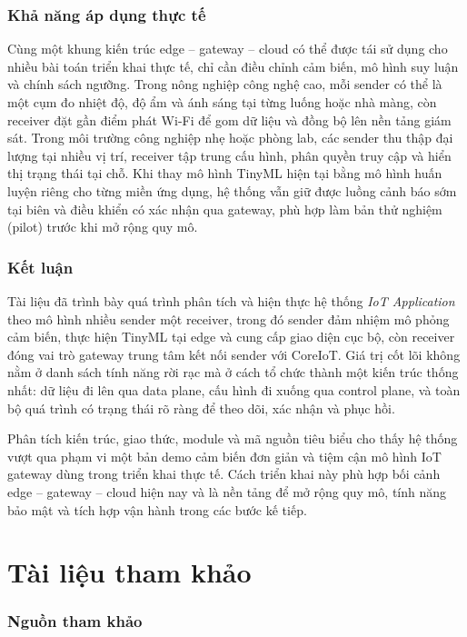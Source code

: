 \documentclass[12pt,a4paper]{report}
\begin{document}
\section{Khả năng áp dụng thực tế}
Cùng một khung kiến trúc edge -- gateway -- cloud có thể được tái sử dụng cho nhiều bài toán triển khai thực tế, chỉ cần điều chỉnh cảm biến, mô hình suy luận và chính sách ngưỡng. Trong nông nghiệp công nghệ cao, mỗi sender có thể là một cụm đo nhiệt độ, độ ẩm và ánh sáng tại từng luống hoặc nhà màng, còn receiver đặt gần điểm phát Wi-Fi để gom dữ liệu và đồng bộ lên nền tảng giám sát. Trong môi trường công nghiệp nhẹ hoặc phòng lab, các sender thu thập đại lượng tại nhiều vị trí, receiver tập trung cấu hình, phân quyền truy cập và hiển thị trạng thái tại chỗ. Khi thay mô hình TinyML hiện tại bằng mô hình huấn luyện riêng cho từng miền ứng dụng, hệ thống vẫn giữ được luồng cảnh báo sớm tại biên và điều khiển có xác nhận qua gateway, phù hợp làm bản thử nghiệm (pilot) trước khi mở rộng quy mô.

\section{Kết luận}
Tài liệu đã trình bày quá trình phân tích và hiện thực hệ thống \textit{IoT Application} theo mô hình nhiều sender một receiver, trong đó sender đảm nhiệm mô phỏng cảm biến, thực hiện TinyML tại edge và cung cấp giao diện cục bộ, còn receiver đóng vai trò gateway trung tâm kết nối sender với CoreIoT. Giá trị cốt lõi không nằm ở danh sách tính năng rời rạc mà ở cách tổ chức thành một kiến trúc thống nhất: dữ liệu đi lên qua data plane, cấu hình đi xuống qua control plane, và toàn bộ quá trình có trạng thái rõ ràng để theo dõi, xác nhận và phục hồi.

Phân tích kiến trúc, giao thức, module và mã nguồn tiêu biểu cho thấy hệ thống vượt qua phạm vi một bản demo cảm biến đơn giản và tiệm cận mô hình IoT gateway dùng trong triển khai thực tế. Cách triển khai này phù hợp bối cảnh edge -- gateway -- cloud hiện nay và là nền tảng để mở rộng quy mô, tính năng bảo mật và tích hợp vận hành trong các bước kế tiếp.

\part{Tài liệu tham khảo}

\section{Nguồn tham khảo}
\end{document}
